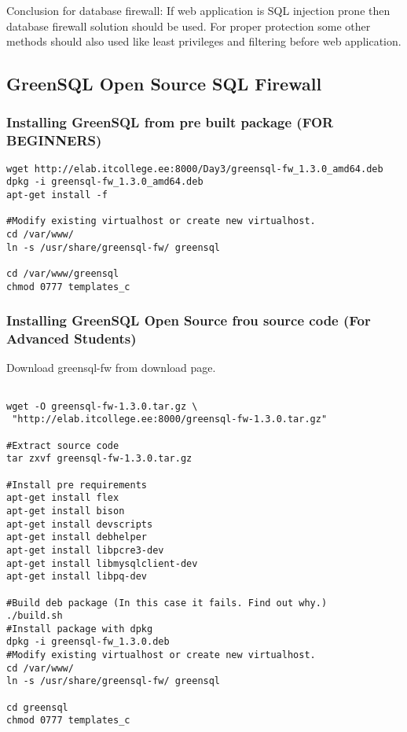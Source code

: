 Conclusion for  database firewall:
If web application is SQL injection prone then database firewall solution should be used.
For proper protection some other methods should also used like least privileges and filtering before web application.

\subsection{GreenSQL Open Source SQL Firewall}
\subsubsection{Installing GreenSQL from pre built package (FOR BEGINNERS)}
\begin{verbatim}
wget http://elab.itcollege.ee:8000/Day3/greensql-fw_1.3.0_amd64.deb
dpkg -i greensql-fw_1.3.0_amd64.deb
apt-get install -f

#Modify existing virtualhost or create new virtualhost.
cd /var/www/
ln -s /usr/share/greensql-fw/ greensql

cd /var/www/greensql
chmod 0777 templates_c
\end{verbatim}

\subsubsection{Installing GreenSQL Open Source frou source code (For Advanced Students)}


Download greensql-fw from download page.
\begin{verbatim}

wget -O greensql-fw-1.3.0.tar.gz \
 "http://elab.itcollege.ee:8000/greensql-fw-1.3.0.tar.gz"

#Extract source code
tar zxvf greensql-fw-1.3.0.tar.gz

#Install pre requirements
apt-get install flex
apt-get install bison
apt-get install devscripts
apt-get install debhelper
apt-get install libpcre3-dev
apt-get install libmysqlclient-dev
apt-get install libpq-dev

#Build deb package (In this case it fails. Find out why.)
./build.sh
#Install package with dpkg
dpkg -i greensql-fw_1.3.0.deb
#Modify existing virtualhost or create new virtualhost.
cd /var/www/
ln -s /usr/share/greensql-fw/ greensql

cd greensql
chmod 0777 templates_c
\end{verbatim}

